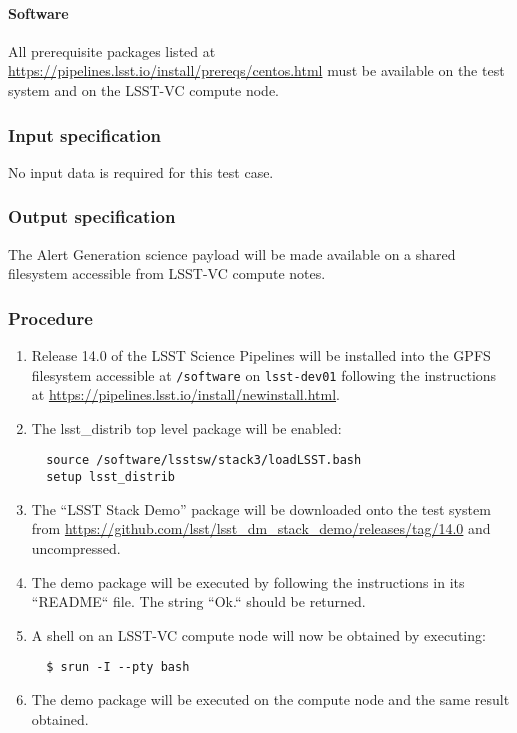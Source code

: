 \paragraph{Software}

All prerequisite packages listed at
\url{https://pipelines.lsst.io/install/prereqs/centos.html} must be available
on the test system and on the LSST-VC compute node.

\subsubsection{Input specification}

No input data is required for this test case.

\subsubsection{Output specification}

The Alert Generation science payload will be made available on a shared
filesystem accessible from LSST-VC compute notes.

\subsubsection{Procedure}

\begin{enumerate}

  \item{Release 14.0 of the LSST Science Pipelines will be installed into the
  GPFS filesystem accessible at \texttt{/software} on \texttt{lsst-dev01}
  following the instructions at
  \url{https://pipelines.lsst.io/install/newinstall.html}.}

  \item{The lsst\_distrib top level package will be enabled:

  \begin{verbatim}
  source /software/lsstsw/stack3/loadLSST.bash
  setup lsst_distrib
  \end{verbatim}
  }

  \item{The ``LSST Stack Demo'' package will be downloaded onto the test
  system from
  \url{https://github.com/lsst/lsst_dm_stack_demo/releases/tag/14.0} and
  uncompressed.}

  \item{The demo package will be executed by following the instructions in its
  ``README`` file. The string ``Ok.`` should be returned.}

  \item{A shell on an LSST-VC compute node will now be obtained by executing:

  \begin{verbatim}
  $ srun -I --pty bash
  \end{verbatim}
  }

  \item{The demo package will be executed on the compute node and the same
  result obtained.}

\end{enumerate}

